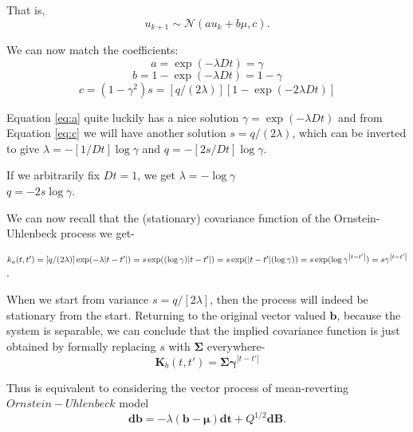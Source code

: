 That is,
\begin{equation}
u_{k+1} \sim \mathcal{N}\left(a u_k + b \mu, c\right).
\end{equation}

We can now match the coefficients:
\begin{equation} \label{eq:a}
a = \exp(-\lambda Dt) = \gamma
\end{equation}
\begin{equation} \label{eq:b}
b = 1 - \exp(-\lambda Dt) = 1 - \gamma
\end{equation}
\begin{equation} \label{eq:c}
c = (1 - \gamma^2) s = [q / (2 \lambda)] [1 - \exp(-2 \lambda Dt)]
\end{equation}

Equation \ref{eq:a} quite luckily has a nice solution 
$\gamma = \exp(-\lambda Dt)$ and from Equation \ref{eq:c} we will have another solution
$s = q / (2 \lambda)$,
which can be inverted to give
$\lambda = -[1 / Dt] \log \gamma$ and
$q = -[2 s / Dt] \log \gamma$. 

If we arbitrarily fix $Dt = 1$, we get
$\lambda = -\log \gamma$\\
$q = -2 s \log \gamma$.

We can now recall that the (stationary) covariance function of the Ornstein-Uhlenbeck process we get-

$k_u(t,t')
  = [q / (2 \lambda)] \exp(-\lambda {\left|t-t'\right|})\\
  = s \exp((\log \gamma) {\left|t-t'\right|})\\
  = s \exp({\left|t-t'\right|}(\log \gamma))\\
  = s \exp(\log \gamma^{\left|t-t'\right|})\\
  = s \gamma^{\left|t-t'\right|}$.

When we start from variance $s = q / \left[2 \lambda\right]$, then the process will indeed be stationary 
from the start. Returning to the original vector valued $\textbf{b}$, because the system is separable, we can 
conclude that the implied covariance function is just obtained by formally replacing $s$ with 
$\boldsymbol{\Sigma}$ everywhere- 
\begin{equation}
\textbf{K}_b(t,t') = \boldsymbol{\Sigma} \boldsymbol{\gamma}^{\left|t-t'\right|}
\end{equation}

Thus is equivalent to considering the vector process of mean-reverting $Ornstein-Uhlenbeck$ model
\begin{equation}
\textbf{db} = -\lambda (\textbf{b} - \boldsymbol{\mu}) \textbf{dt} + Q^{1/2} \textbf{dB}.
\end{equation}
